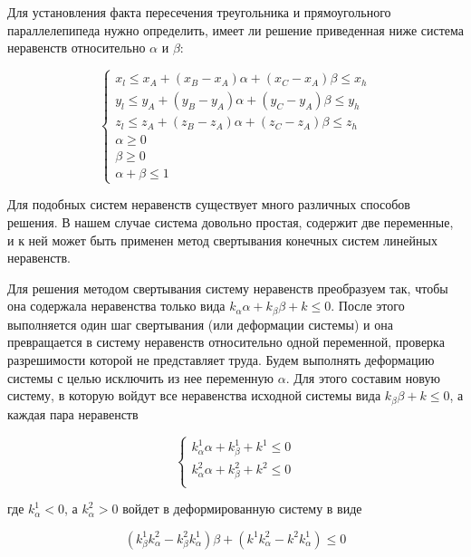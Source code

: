 \documentclass[
11pt,%
tightenlines,%
twoside,%
onecolumn,%
nofloats,%
nobibnotes,%
nofootinbib,%
superscriptaddress,%
noshowpacs,%
centertags]%
{revtex4}
\begin{document}
Для установления факта пересечения треугольника и прямоугольного параллелепипеда нужно определить, имеет ли решение приведенная ниже система неравенств относительно $\alpha$ и $\beta$:

\begin{equation}
\begin{cases}
x_l \le x_A + (x_B - x_A)\alpha + (x_C - x_A)\beta \le x_h \\
y_l \le y_A + (y_B - y_A)\alpha + (y_C - y_A)\beta \le y_h \\
z_l \le z_A + (z_B - z_A)\alpha + (z_C - z_A)\beta \le z_h \\
\alpha \ge 0 \\
\beta \ge 0 \\
\alpha + \beta \le 1
\end{cases}
\end{equation}

Для подобных систем неравенств существует много различных способов решения.
В нашем случае система довольно простая, содержит две переменные, и к ней может быть применен метод свертывания конечных систем линейных неравенств.

Для решения методом свертывания систему неравенств преобразуем так, чтобы она содержала неравенства только вида $k_{\alpha}\alpha + k_{\beta}\beta + k \le 0$.
После этого выполняется один шаг свертывания (или деформации системы) и она превращается в систему неравенств относительно одной переменной, проверка разрешимости которой не представляет труда.
Будем выполнять деформацию системы с целью исключить из нее переменную $\alpha$.
Для этого составим новую систему, в которую войдут все неравенства исходной системы вида $k_{\beta}\beta + k \le 0$, а каждая пара неравенств

\begin{equation}
\begin{cases}
k_{\alpha}^1 \alpha + k_{\beta}^1 + k^1 \le 0 \\
k_{\alpha}^2 \alpha + k_{\beta}^2 + k^2 \le 0 \\
\end{cases}
\end{equation}

где $k_{\alpha}^1 < 0$, а $k_{\alpha}^2 > 0$ войдет в деформированную систему в виде

\begin{equation}
(k_{\beta}^1 k_{\alpha}^2 - k_{\beta}^2 k_{\alpha}^1)\beta + (k^1 k_{\alpha}^2 - k^2 k_{\alpha}^1) \le 0
\end{equation}
\end{document}
